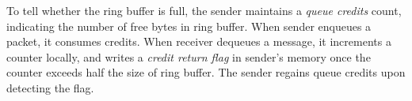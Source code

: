 
To tell whether the ring buffer is full, the sender maintains a \textit{queue credits} count, indicating the number of free bytes in ring buffer.
When sender enqueues a packet, it consumes credits. When receiver dequeues a message, it increments a counter locally, and writes a \textit{credit return flag} in sender's memory once the counter exceeds half the size of ring buffer. The sender regains queue credits upon detecting the flag.

